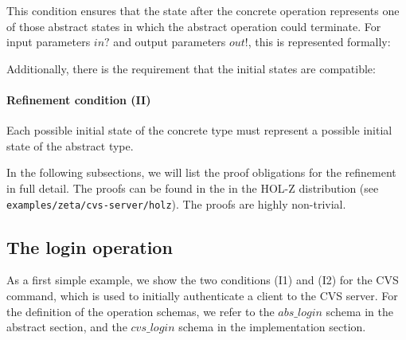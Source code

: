 This condition ensures that the state after the concrete operation represents
one of those abstract states in which the abstract operation could terminate.
For input parameters $in?$ and output parameters $out!$, this is represented
formally:
  
Additionally, there is the requirement that the initial states are compatible:
\paragraph{Refinement condition (II)}
Each possible initial state of the concrete type must represent a possible
initial state of the abstract type.

In the following subsections, we will list the proof obligations for the
refinement in full detail. The proofs can be found in the in the HOL-Z
distribution (see \verb+examples/zeta/cvs-server/holz+). The proofs are highly
non-trivial.



\subsection{The login operation}
As a first simple example, we show the two conditions (I1) and (I2) for the CVS
 command, which is used to initially authenticate a client to the
CVS server.  For the definition of the operation schemas, we refer to the
$abs\_login$ schema in the abstract section, and the $cvs\_login$ schema in the
implementation section.

